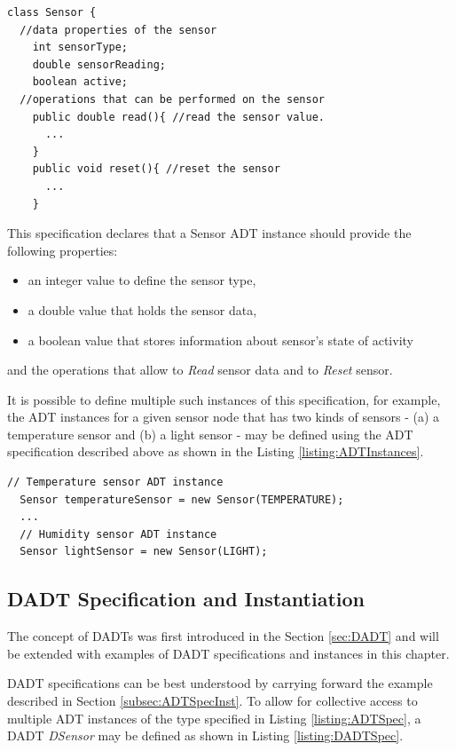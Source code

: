 \begin{lstlisting}[frame=trbl, basewidth={0.55em, 0.6em}, captionpos=b,
basicstyle=\ttfamily\footnotesize, breaklines, caption = Sensor ADT instances, label =
listing:ADTSpec]
class Sensor {
  //data properties of the sensor 
    int sensorType;
    double sensorReading;
    boolean active; 
  //operations that can be performed on the sensor  
    public double read(){ //read the sensor value.
	  ...
	} 
	public void reset(){ //reset the sensor
	  ...
	}    
\end{lstlisting}

This specification declares that a Sensor ADT instance should provide the following properties:
\begin{itemize}
\item an integer value to define the sensor type,
\item a double value that holds the sensor data, 
\item a boolean value that stores information about sensor's state of activity
\end{itemize}
and the operations that allow to \emph{Read} sensor data and to \emph{Reset}
sensor.

It is possible to define multiple such instances of this
specification, for example, the ADT instances for a given sensor node that has two kinds of sensors - (a) a
temperature sensor and (b) a light sensor - may be defined using the ADT
specification described above as shown in the Listing
\ref{listing:ADTInstances}. 
\begin{lstlisting}[frame=trbl, basewidth={0.55em, 0.6em}, captionpos=b,
basicstyle=\ttfamily\footnotesize, breaklines, caption = Sensor ADT instances, label =
listing:ADTInstances]
  // Temperature sensor ADT instance
  Sensor temperatureSensor = new Sensor(TEMPERATURE);
  ...
  // Humidity sensor ADT instance  
  Sensor lightSensor = new Sensor(LIGHT);
\end{lstlisting}

\subsection{DADT Specification and Instantiation} \label{subsubsec:dadtspecandinst}

The concept of DADTs was first introduced in the Section \ref{sec:DADT} and will
be extended with examples of DADT specifications and instances in this chapter.
 
DADT specifications can be best understood by carrying forward the example
described in Section \ref{subsec:ADTSpecInst}. To allow for collective access
to multiple ADT instances of the type specified in Listing
\ref{listing:ADTSpec}, a DADT \emph{DSensor} may be defined as shown in Listing
\ref{listing:DADTSpec}.   
 
